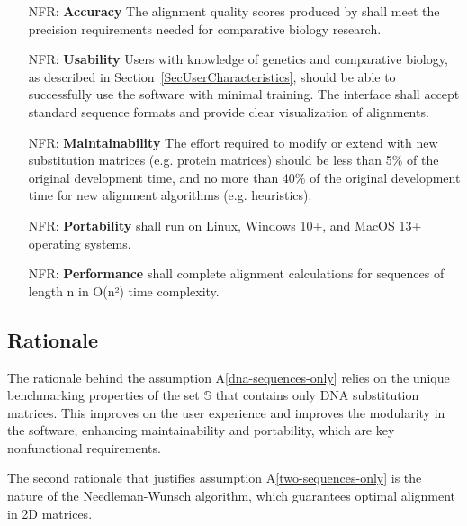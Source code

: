\documentclass[12pt]{article}
\newcommand{\aref}[1]{A\ref{#1}}
\newcounter{nfrnum} %
\begin{document}
\noindent \begin{itemize}

  \item[NFR\refstepcounter{nfrnum}\thenfrnum \label{NFR_Accuracy}:]
  \textbf{Accuracy} The alignment quality scores produced by \progname{} shall meet the 
  precision requirements needed for comparative biology research. 
  
  \item[NFR\refstepcounter{nfrnum}\thenfrnum \label{NFR_Usability}:] \textbf{Usability}
  Users with knowledge of genetics and comparative biology, as described in Section~\ref{SecUserCharacteristics}, 
  should be able to successfully use the software with minimal training. 
  The interface shall accept standard sequence formats and provide clear visualization of alignments.
  
  \item[NFR\refstepcounter{nfrnum}\thenfrnum \label{NFR_Maintainability}:]
  \textbf{Maintainability} The effort required to modify or extend \progname{} 
  with new substitution matrices (e.g. protein matrices) should be less than 5\% 
  of the original development time, and no more than 40\% of the original development time 
  for new alignment algorithms (e.g. heuristics).
  
  \item[NFR\refstepcounter{nfrnum}\thenfrnum \label{NFR_Portability}:]
  \textbf{Portability} \progname{} shall run on Linux, Windows 10+, and MacOS 13+ operating systems.
  
  \item[NFR\refstepcounter{nfrnum}\thenfrnum \label{NFR_Performance}:]
  \textbf{Performance} \progname{} shall complete alignment calculations for sequences of length n in O(n²) time complexity.

\end{itemize}

\subsection{Rationale}

The rationale behind the assumption \aref{dna-sequences-only} relies on the unique 
benchmarking properties of the set $\mathbb{S}$ that contains only DNA substitution matrices.
This improves on the user experience and improves the modularity in the software, enhancing 
maintainability and portability, which are key nonfunctional requirements.

The second rationale that justifies assumption \aref{two-sequences-only} is the
nature of the Needleman-Wunsch algorithm, which guarantees optimal alignment in 2D matrices.
\end{document}
